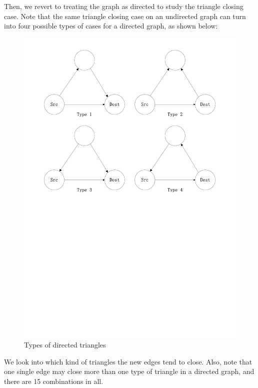 \documentclass[10pt]{article}
\begin{document}
\begin{multicols}{2}
Then, we revert to treating the graph as directed to study the triangle closing case. Note that the same triangle closing case on an undirected graph can turn into four possible types of cases for a directed graph, as shown below: 
\begin{figure}[H]
    \centering
        \includegraphics[scale = 0.35, trim = 2cm 14cm 2cm 1cm]{./graphs/triangles.pdf}
    \caption{Types of directed triangles} \label{fig:triangles}
\end{figure}
We look into which kind of triangles the new edges tend to close. Also, note that one single edge may close more than one type of triangle in a directed graph, and there are 15 combinations in all. 
\begin{figure}[H]
    \centering

\end{figure}
\end{multicols}
\end{document}
